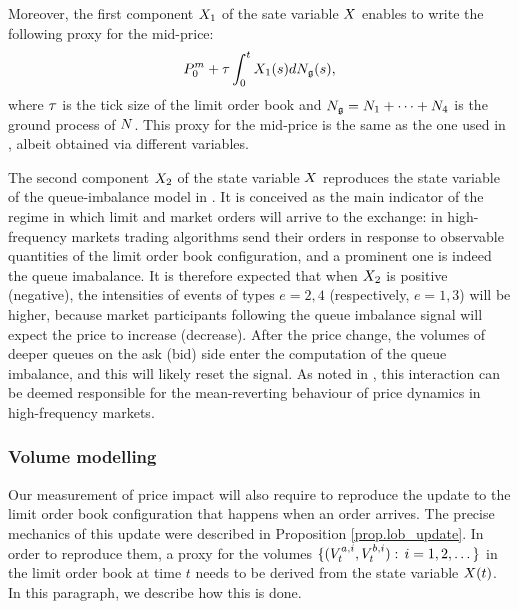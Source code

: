 \documentclass[10pt]{article}
\begin{document}
Moreover, the first component $\stateVariable_1$ of the sate variable $\stateVariable$ enables to write the following proxy for the mid-price:
\begin{equation}\label{eq.midprice_proxy}
 \midprice_0 + \tickSizeOfLOB \intzerot \stateVariable_1(s) d\groundProc(s),
\end{equation}
where $\tickSizeOfLOB$ is the tick size of the limit order book and $\groundProc = \countingProc[1] + \dots + \countingProc[4]$ is the ground process of $\multiCountingProc$. This proxy for the mid-price  is the same as the one used in \citealp{BM14haw}, albeit obtained via different variables. 

The second component $\stateVariable_2$ of the state variable $\stateVariable$ reproduces the state variable of the queue-imbalance model in \citealp{MP18sta}. It is conceived as the main indicator of the regime in which limit and market orders will arrive to the exchange: in high-frequency markets trading algorithms send their orders in response to observable quantities of the limit order book configuration, and a prominent one is indeed the queue imabalance. It is therefore expected that when $\stateVariable_2$ is positive (negative), the intensities of events of types $e=2,4$ (respectively, $e=1,3$) will be higher, because market participants following the queue imbalance signal will expect the price to increase (decrease). After the price change,  the volumes of deeper queues on the ask (bid) side enter the computation of the queue imbalance, and this will likely reset the signal.  As noted in \citealp{MP18sta}, this interaction can be deemed responsible for the mean-reverting behaviour of price dynamics in high-frequency markets. 


\subsubsection{Volume modelling}
Our measurement of price impact will also require to reproduce the update to the limit order book configuration that happens when an order arrives. The precise mechanics of this update were described in Proposition \ref{prop.lob_update}. In order to reproduce them, a proxy for the volumes $\lbrace (\nthBestAskVolume[i]_t, \nthBestBidVolume[i]_t): \, i=1,2,\dots\rbrace$ in the limit order book at time $t$ needs to be derived from the state variable $\stateVariable(t)$. In this paragraph, we describe how this is done. 
\end{document}

